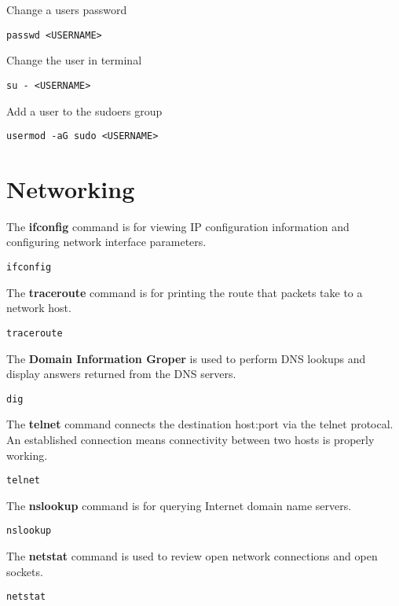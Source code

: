 Change a users password
\begin{lstlisting}
passwd <USERNAME>
\end{lstlisting}

Change the user in terminal
\begin{lstlisting}
su - <USERNAME>
\end{lstlisting}

Add a user to the sudoers group
\begin{lstlisting}
usermod -aG sudo <USERNAME>
\end{lstlisting}













\section{Networking}

The \textbf{ifconfig} command is for viewing IP configuration information and configuring network interface parameters.
\begin{lstlisting}
ifconfig
\end{lstlisting}

The \textbf{traceroute} command is for printing the route that packets take to a network host.
\begin{lstlisting}
traceroute
\end{lstlisting}

The \textbf{Domain Information Groper} is used to perform DNS lookups and display answers returned from the DNS servers.
\begin{lstlisting}
dig
\end{lstlisting}

The \textbf{telnet} command connects the destination host:port via the telnet protocal. An established connection means connectivity between two hosts is properly working.
\begin{lstlisting}
telnet
\end{lstlisting}

The \textbf{nslookup} command is for querying Internet domain name servers.
\begin{lstlisting}
nslookup
\end{lstlisting}

The \textbf{netstat} command is used to review open network connections and open sockets. 
\begin{lstlisting}
netstat
\end{lstlisting}

